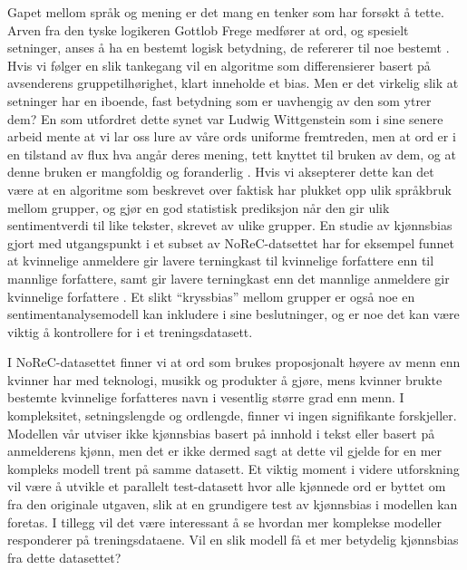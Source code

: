 \documentclass[11pt, a4paper]{article}
\begin{document}
Gapet mellom språk og mening er det mang en tenker som har forsøkt å tette. Arven fra den tyske logikeren Gottlob Frege medfører at ord, og spesielt setninger, anses å ha en bestemt logisk betydning, de refererer til noe bestemt \cite{frege}. Hvis vi følger en slik tankegang vil en algoritme som differensierer basert på avsenderens gruppetilhørighet, klart inneholde et bias. Men er det virkelig slik at setninger har en iboende, fast betydning som er uavhengig av den som ytrer dem? En som utfordret dette synet var Ludwig Wittgenstein som i sine senere arbeid mente at vi lar oss lure av våre ords uniforme fremtreden, men at ord er i en tilstand av flux hva angår deres mening, tett knyttet til bruken av dem, og at denne bruken er mangfoldig og foranderlig \cite{sep-wittgenstein}. Hvis vi aksepterer dette kan det være at en algoritme som beskrevet over faktisk har plukket opp ulik språkbruk mellom grupper, og gjør en god statistisk prediksjon når den gir ulik sentimentverdi til like tekster, skrevet av ulike grupper. En studie av kjønnsbias gjort med utgangspunkt i et subset av NoReC-datsettet har for eksempel funnet at kvinnelige anmeldere gir lavere terningkast til kvinnelige forfattere enn til mannlige forfattere, samt gir lavere terningkast enn det mannlige anmeldere gir kvinnelige forfattere \cite{touileb-etal-2020-gender}. Et slikt “kryssbias” mellom grupper er også noe en sentimentanalysemodell kan inkludere i sine beslutninger, og er noe det kan være viktig å kontrollere for i et treningsdatasett.

I NoReC-datasettet finner vi at ord som brukes proposjonalt høyere av menn enn kvinner har med teknologi, musikk og produkter å gjøre, mens kvinner brukte bestemte kvinnelige forfatteres navn i vesentlig større grad enn menn. I kompleksitet, setningslengde og ordlengde, finner vi ingen signifikante forskjeller. Modellen vår utviser ikke kjønnsbias basert på innhold i tekst eller basert på anmelderens kjønn, men det er ikke dermed sagt at dette vil gjelde for en mer kompleks modell trent på samme datasett. Et viktig moment i videre utforskning vil være å utvikle et parallelt test-datasett hvor alle kjønnede ord er byttet om fra den originale utgaven, slik at en grundigere test av kjønnsbias i modellen kan foretas. I tillegg vil det være interessant å se hvordan mer komplekse modeller responderer på treningsdataene. Vil en slik modell få et mer betydelig kjønnsbias fra dette datasettet?


\printbibliography
\end{document}
